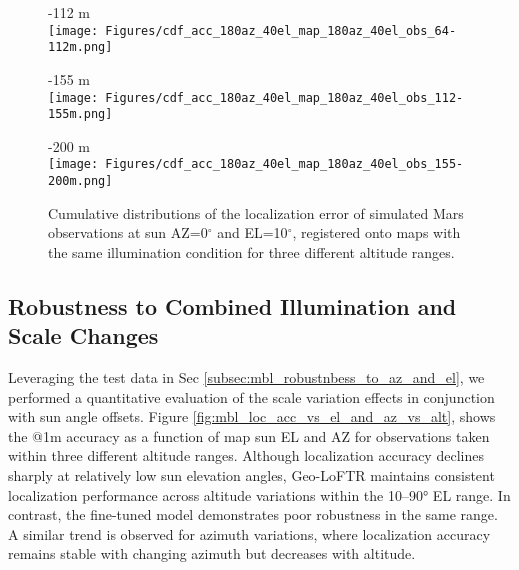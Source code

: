 \begin{figure}
\centering
\begin{minipage}[b]{0.49\linewidth}
    -112 m
    \vspace{2pt} \\
    \texttt{[image: Figures/cdf\_acc\_180az\_40el\_map\_180az\_40el\_obs\_64-112m.png]}
\end{minipage}
\begin{minipage}[b]{0.49\linewidth}
    -155 m
    \vspace{2pt} \\
    \texttt{[image: Figures/cdf\_acc\_180az\_40el\_map\_180az\_40el\_obs\_112-155m.png]}
\end{minipage}
\begin{minipage}[b]{0.49\linewidth}
    -200 m
    \vspace{2pt} \\
    \texttt{[image: Figures/cdf\_acc\_180az\_40el\_map\_180az\_40el\_obs\_155-200m.png]}
\end{minipage}
\caption{\label{fig:cdf_scale_var}Cumulative distributions of the localization error of simulated Mars observations at sun AZ=0$^{\circ}$ and EL=10$^{\circ}$, registered onto maps with the same illumination condition for three different altitude ranges.}
\end{figure}


\subsection{Robustness to Combined Illumination and Scale Changes}
\label{subsec:mbl_robustnbess_to_scale_ill}

Leveraging the test data in Sec \ref{subsec:mbl_robustnbess_to_az_and_el}, we performed a quantitative evaluation of the scale variation effects in conjunction with sun angle offsets. Figure \ref{fig:mbl_loc_acc_vs_el_and_az_vs_alt}, shows the @1m accuracy as a function of map sun EL and AZ for observations taken within three different altitude ranges.
Although localization accuracy declines sharply at relatively low sun elevation angles, Geo-LoFTR maintains consistent localization performance across altitude variations within the 10–90° EL range. In contrast, the fine-tuned model demonstrates poor robustness in the same range. A similar trend is observed for azimuth variations, where localization accuracy remains stable with changing azimuth but decreases with altitude.


